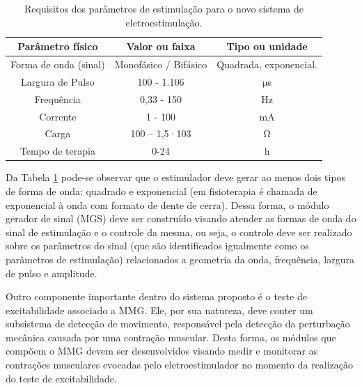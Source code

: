 \begin{table}[h]
    \centering
    \caption{Requisitos dos parâmetros de estimulação para o novo sistema de eletroestimulação.}
    \begin{tabular}{|c|c|c|}
    \hline
    \rowcolor[HTML]{D6D6D6} 
    \textbf{Parâmetro físico} & \textbf{Valor ou faixa} & \textbf{Tipo ou unidade} \\ \hline
    Forma de onda (sinal)     & Monofásico / Bifásico   & Quadrada, exponencial.   \\ \hline
    Largura de Pulso          & 100 - 1.106             & $\mathrm{\mu}$s                       \\ \hline
    Frequência                & 0,33 - 150              & Hz                       \\ \hline
    Corrente                  & 1 - 100                 & mA                       \\ \hline
    Carga                     & 100 – 1,5·103           & $\mathrm{\Omega}$                      \\ \hline
    Tempo de terapia          & 0-24                    & h                        \\ \hline
    \end{tabular}
    \label{tab:c4_rpe1}
\end{table}


Da Tabela \ref{tab:c4_rpe1} pode-se observar que o estimulador deve gerar ao menos dois tipos de forma de onda: quadrado e exponencial (em fisioterapia é chamada de exponencial à onda com formato de dente de cerra). Dessa forma, o módulo gerador de sinal (\acrshort{MGS}) deve ser construído visando atender as formas de onda do sinal de estimulação e o controle da mesma, ou seja, o controle deve ser realizado sobre os parâmetros do sinal (que são identificados igualmente como os parâmetros de estimulação) relacionados a geometria da onda, frequência, largura de pulso e amplitude.

Outro componente importante dentro do sistema proposto é o teste de excitabilidade associado a \acrshort{MMG}. Ele, por sua natureza, deve conter um subsistema de detecção de movimento, responsável pela detecção da perturbação mecânica causada por uma contração muscular. Desta forma, os módulos que compõem o \acrshort{MMG} devem ser desenvolvidos visando medir e monitorar as contrações musculares evocadas pelo eletroestimulador no momento da realização do teste de excitabilidade. 

